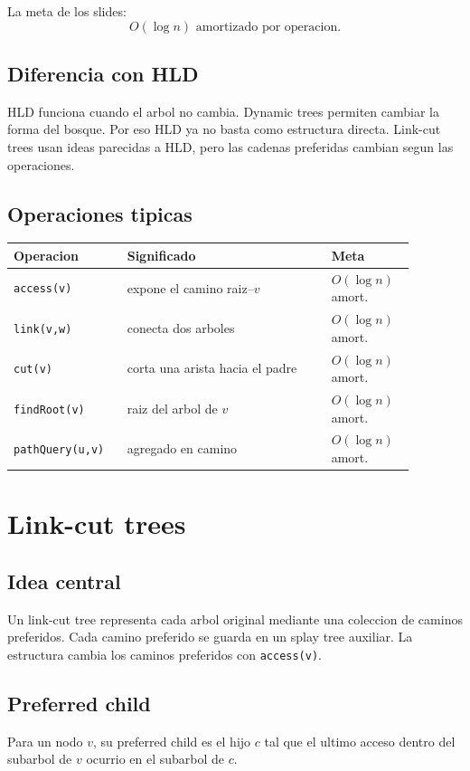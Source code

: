 \documentclass[10pt]{article}
\newcommand{\bigO}{O}
\begin{document}
La meta de los slides:
\[
\bigO(\log n)\text{ amortizado por operacion}.
\]

\subsection{Diferencia con HLD}
HLD funciona cuando el arbol no cambia. Dynamic trees permiten cambiar la forma
del bosque. Por eso HLD ya no basta como estructura directa. Link-cut trees usan
ideas parecidas a HLD, pero las cadenas preferidas cambian segun las operaciones.

\subsection{Operaciones tipicas}
\begin{center}
\begin{tabular}{p{0.24\linewidth}p{0.46\linewidth}p{0.18\linewidth}}
\toprule
Operacion & Significado & Meta \\
\midrule
\texttt{access(v)} & expone el camino raiz--$v$ & $\bigO(\log n)$ amort. \\
\texttt{link(v,w)} & conecta dos arboles & $\bigO(\log n)$ amort. \\
\texttt{cut(v)} & corta una arista hacia el padre & $\bigO(\log n)$ amort. \\
\texttt{findRoot(v)} & raiz del arbol de $v$ & $\bigO(\log n)$ amort. \\
\texttt{pathQuery(u,v)} & agregado en camino & $\bigO(\log n)$ amort. \\
\bottomrule
\end{tabular}
\end{center}

\newpage
\section{Link-cut trees}

\subsection{Idea central}
Un link-cut tree representa cada arbol original mediante una coleccion de
caminos preferidos. Cada camino preferido se guarda en un splay tree auxiliar.
La estructura cambia los caminos preferidos con \texttt{access(v)}.

\subsection{Preferred child}
Para un nodo $v$, su preferred child es el hijo $c$ tal que el ultimo acceso
dentro del subarbol de $v$ ocurrio en el subarbol de $c$.
\end{document}

